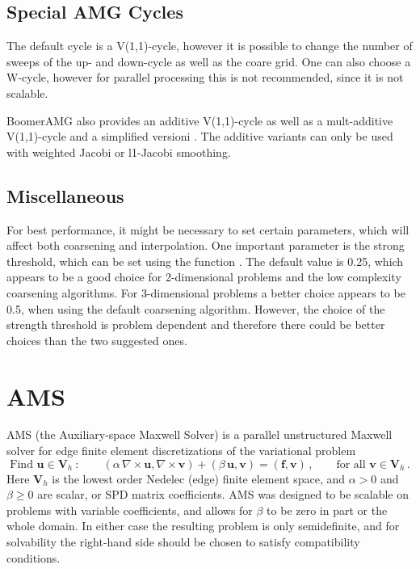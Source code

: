 \subsection{Special AMG Cycles}
The default cycle is a V(1,1)-cycle, however it is possible to change the number of sweeps of the up- and down-cycle as well as the coare grid. One can also choose a W-cycle, however for parallel processing this is not recommended, since it is not scalable.

BoomerAMG also provides an additive V(1,1)-cycle as well as a mult-additive V(1,1)-cycle and a simplified versioni \cite{Vassilevski_UMYang_2014}. The additive variants can only be used with weighted Jacobi or l1-Jacobi smoothing.

\subsection{Miscellaneous}
For best performance, it might be necessary to set certain parameters, which will
affect both coarsening and interpolation.
One important parameter is the strong threshold, which can be set
using the function .
The default value is 0.25, which appears to be a good choice for 2-dimensional
problems and the low complexity coarsening algorithms. 
For 3-dimensional problems a better choice appears to be 0.5, when using the
default coarsening algorithm. However,
the choice of the strength threshold is problem dependent and therefore
there could be better choices than the two suggested ones.


\section{AMS}
\label{AMS}

AMS (the Auxiliary-space Maxwell Solver) is a parallel unstructured Maxwell
solver for edge finite element discretizations of the variational problem
\begin{equation} \label{ams-maxwell}
\mbox{Find } {\mathbf u} \in {\mathbf V}_h \>:\qquad
(\alpha\, \nabla \times {\mathbf u},  \nabla \times {\mathbf v}) +
(\beta\, {\mathbf u},  {\mathbf v}) = ({\mathbf f},  {\mathbf v})\,,
\qquad \mbox{for all } {\mathbf v} \in {\mathbf V}_h \,.
\end{equation}
Here ${\mathbf V}_h$ is the lowest order Nedelec (edge) finite element space,
and $\alpha>0$ and $\beta \ge 0$ are scalar, or SPD matrix coefficients.
AMS was designed to be scalable on problems with variable coefficients,
and allows for $\beta$ to be zero in part or the whole domain.
In either  case the resulting problem is only semidefinite, and for solvability
the right-hand side should be chosen to satisfy compatibility conditions.

